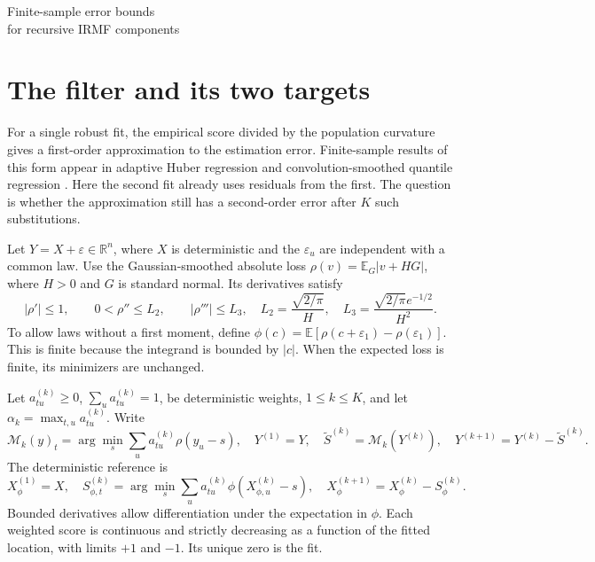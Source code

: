 \documentclass[11pt]{article}
\newcommand{\E}{\mathbb E}
\newcommand{\R}{\mathbb R}
\theoremstyle{remark}
\begin{document}
\begin{center}
{\LARGE Finite-sample error bounds\\[3pt] for recursive IRMF components\par}
\end{center}
\begin{abstract}
Intrinsic robust multiscale filtering (IRMF) fits a local location at each
scale and subtracts it before the next fit. A noise fluctuation can
therefore affect a component both directly and through every earlier fit.
We bound these two contributions together on a grid of \(n\) points.
If the largest weight at stage \(k\) is \(\alpha_k\), the leading error is of
order \(\sqrt{z\alpha_k}\) and the linearization error is of order
\(z\alpha_k\), simultaneously over \(K\) stages, where
\(z=x+\log(10nK)\) at confidence \(1-e^{-x}\).
The bound requires stable residual operators, limited curvature variation
and sufficiently small weights. It applies first to a deterministic reference
path. A fourth moment, localization and tail control give the same rate for
the population fits to the actual residuals.
\end{abstract}

\section{The filter and its two targets}
For a single robust fit, the empirical score divided by the population
curvature gives a first-order approximation to the estimation error.
Finite-sample results of this form appear in adaptive Huber regression
\cite{sun} and convolution-smoothed quantile regression \cite{he}.
Here the second fit already uses residuals from the first. The question
is whether the approximation still has a second-order error after \(K\)
such substitutions.

Let \(Y=X+\varepsilon\in\R^n\), where \(X\) is deterministic and the
\(\varepsilon_u\) are independent with a common law. Use the
Gaussian-smoothed absolute loss \(\rho(v)=\E_G|v+HG|\), where \(H>0\)
and \(G\) is standard normal. Its derivatives satisfy
\[
 |\rho'|\le1,\qquad 0<\rho''\le L_2,\qquad |\rho'''|\le L_3,
 \quad L_2=\frac{\sqrt{2/\pi}}H,\quad
 L_3=\frac{\sqrt{2/\pi}e^{-1/2}}{H^2}.
\]
To allow laws without a first moment, define
\(\phi(c)=\E[\rho(c+\varepsilon_1)-\rho(\varepsilon_1)]\).
This is finite because the integrand is bounded by \(|c|\).
When the expected loss is finite, its minimizers are unchanged.

Let \(a_{tu}^{(k)}\ge0\), \(\sum_u a_{tu}^{(k)}=1\), be deterministic
weights, \(1\le k\le K\), and let \(\alpha_k=\max_{t,u}a_{tu}^{(k)}\).
Write
\[
 \mathcal M_k(y)_t=\arg\min_s\sum_u a_{tu}^{(k)}\rho(y_u-s),
 \quad Y^{(1)}=Y,\quad
 \widetilde S^{(k)}=\mathcal M_k(Y^{(k)}),\quad
 Y^{(k+1)}=Y^{(k)}-\widetilde S^{(k)}.
\]
The deterministic reference is
\[
 X_\phi^{(1)}=X,\quad
 S_{\phi,t}^{(k)}=\arg\min_s\sum_u a_{tu}^{(k)}\phi(X_{\phi,u}^{(k)}-s),
 \quad X_\phi^{(k+1)}=X_\phi^{(k)}-S_\phi^{(k)}.
\]
Bounded derivatives allow differentiation under the expectation in \(\phi\).
Each weighted score is continuous and strictly decreasing as a function of
the fitted location, with limits \(+1\) and \(-1\). Its unique zero is the fit.
\end{document}
